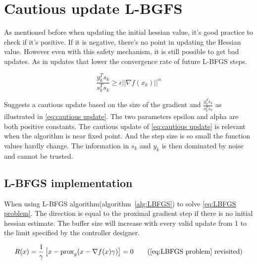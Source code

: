 	\section{Cautious update L-BGFS}
	As mentioned before when updating the initial hessian value, it's good practice to check if it's positive. If it is negative, there's no point in updating the Hessian value. However even with this safety mechanism, it is still possible to get bad updates. As in updates that lower the convergence rate of future L-BFGS steps.
	
	\begin{equation}
		\frac{y_k^Ts_k}{s_k^Ts_k} \ge \epsilon ||\nabla f(x_k)||^\alpha
		\label{eq:cautious update}
	\end{equation}
	
	\cite{Dong-HuiLi1999} Suggests a cautious update based on the size of the gradient and $\frac{y_k^Ts_k}{s_k^Ts_k}$ as illustrated in \eqref{eq:cautious update}. The two parameters epsilon and alpha are both positive constants. The cautious update of \eqref{eq:cautious update} is relevant when the algorithm is near fixed point. And the step size is so small the function values hardly change. The information in $s_k$ and $y_k$ is then dominated by noise and cannot be trusted.
	
	\subsection{L-BFGS implementation}
		When using  L-BFGS algorithm(algorithm~\ref{alg:LBFGS}) to solve \eqref{eq:LBFGS problem}. The direction is equal to the proximal gradient step if there is no initial hessian estimate. The buffer size will increase with every valid update from 1 to the limit specified by the controller designer.
		
		\begin{equation}
			R(x) = \frac{1}{\gamma}\left[ x - \prox_g( x - \nabla f(x)\gamma) \right] = 0
			\tag{\eqref{eq:LBFGS problem} revisited}
		\end{equation}
		
